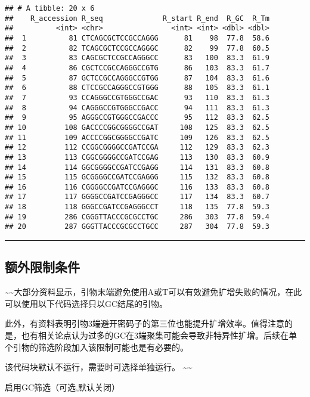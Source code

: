 \documentclass[
]{article}
\begin{document}
\begin{verbatim}
## # A tibble: 20 x 6
##    R_accession R_seq              R_start R_end  R_GC  R_Tm
##          <int> <chr>                <int> <int> <dbl> <dbl>
##  1          81 CTCAGCGCTCCGCCAGGG      81    98  77.8  58.6
##  2          82 TCAGCGCTCCGCCAGGGC      82    99  77.8  60.5
##  3          83 CAGCGCTCCGCCAGGGCC      83   100  83.3  61.9
##  4          86 CGCTCCGCCAGGGCCGTG      86   103  83.3  61.7
##  5          87 GCTCCGCCAGGGCCGTGG      87   104  83.3  61.6
##  6          88 CTCCGCCAGGGCCGTGGG      88   105  83.3  61.1
##  7          93 CCAGGGCCGTGGGCCGAC      93   110  83.3  61.3
##  8          94 CAGGGCCGTGGGCCGACC      94   111  83.3  61.3
##  9          95 AGGGCCGTGGGCCGACCC      95   112  83.3  62.5
## 10         108 GACCCCGGCGGGGCCGAT     108   125  83.3  62.5
## 11         109 ACCCCGGCGGGGCCGATC     109   126  83.3  62.5
## 12         112 CCGGCGGGGCCGATCCGA     112   129  83.3  62.3
## 13         113 CGGCGGGGCCGATCCGAG     113   130  83.3  60.9
## 14         114 GGCGGGGCCGATCCGAGG     114   131  83.3  60.8
## 15         115 GCGGGGCCGATCCGAGGG     115   132  83.3  60.8
## 16         116 CGGGGCCGATCCGAGGGC     116   133  83.3  60.8
## 17         117 GGGGCCGATCCGAGGGCC     117   134  83.3  60.7
## 18         118 GGGCCGATCCGAGGGCCT     118   135  77.8  59.3
## 19         286 CGGGTTACCCGCGCCTGC     286   303  77.8  59.4
## 20         287 GGGTTACCCGCGCCTGCC     287   304  77.8  59.3
\end{verbatim}

\begin{center}\rule{0.5\linewidth}{0.5pt}\end{center}

\hypertarget{ux989dux5916ux9650ux5236ux6761ux4ef6}{%
\subsection{额外限制条件}\label{ux989dux5916ux9650ux5236ux6761ux4ef6}}

\textasciitilde\textasciitilde 大部分资料显示，引物末端避免使用A或T可以有效避免扩增失败的情况，在此可以使用以下代码选择只以GC结尾的引物。

此外，有资料表明引物3端避开密码子的第三位也能提升扩增效率。值得注意的是，也有相关论点认为过多的GC在3端聚集可能会导致非特异性扩增。后续在单个引物的筛选阶段加入该限制可能也是有必要的。

该代码块默认不运行，需要时可选择单独运行。
\textasciitilde\textasciitilde{}

启用GC筛选（可选,默认关闭）
\end{document}
